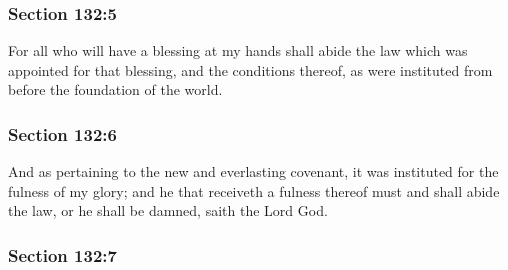 
	\subsubsection{Section 132:5} %
		\label{DC132-5}

		For all who will have a blessing at my hands shall abide the law which was appointed for that blessing, and the conditions thereof, as were instituted from before the foundation of the world.


	\subsubsection{Section 132:6} %
		\label{DC132-6}

		And as pertaining to the new and everlasting covenant, it was instituted for the fulness of my glory; and he that receiveth a fulness thereof must and shall abide the law, or he shall be damned, saith the Lord God.


	\subsubsection{Section 132:7} %
		\label{DC132-7}

